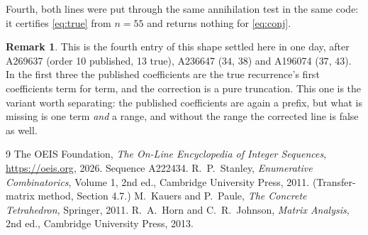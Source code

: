 \documentclass[11pt,a4paper]{article}
\theoremstyle{plain}
\theoremstyle{definition}
\newtheorem{remark}[theorem]{Remark}
\begin{document}
Fourth, both lines were put through the same annihilation test in the same code: it certifies
\eqref{eq:true} from $n=55$ and returns nothing for \eqref{eq:conj}.

\begin{remark}
This is the fourth entry of this shape settled here in one day, after A269637 (order 10
published, 13 true), A236647 ($34$, $38$) and A196074 ($37$, $43$). In the first three the
published coefficients are the true recurrence's first coefficients term for term, and the
correction is a pure truncation. This one is the variant worth separating: the published
coefficients are again a prefix, but what is missing is one term \emph{and} a range, and
without the range the corrected line is false as well.
\end{remark}

\begin{thebibliography}{9}
 The OEIS Foundation, \emph{The On-Line Encyclopedia of Integer Sequences},
\url{https://oeis.org}, 2026. Sequence A222434.
 R.~P.~Stanley, \emph{Enumerative Combinatorics}, Volume 1, 2nd ed.,
Cambridge University Press, 2011. (Transfer-matrix method, Section 4.7.)
 M.~Kauers and P.~Paule, \emph{The Concrete Tetrahedron}, Springer, 2011.
 R.~A.~Horn and C.~R.~Johnson, \emph{Matrix Analysis}, 2nd ed., Cambridge
University Press, 2013.
\end{thebibliography}
\end{document}
